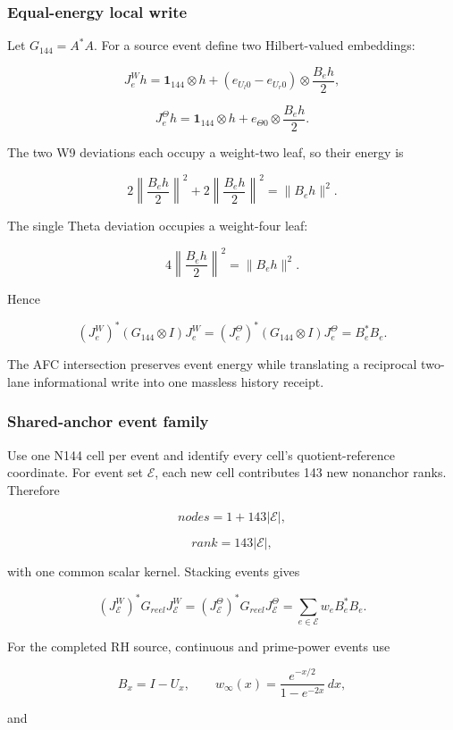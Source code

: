 \subsubsection{Equal-energy local write}\label{viii-ch06-equal-energy-local-write}

Let \(G_{144}=A^*A\). For a source event define two Hilbert-valued
embeddings:

\[
J_e^Wh
=\mathbf1_{144}\otimes h
+(e_{U_l0}-e_{U_r0})\otimes\frac{B_eh}{2},
\]

\[
J_e^\Theta h
=\mathbf1_{144}\otimes h
+e_{\Theta0}\otimes\frac{B_eh}{2}.
\]

The two W9 deviations each occupy a weight-two leaf, so their energy is

\[
2\left\|\frac{B_eh}{2}\right\|^2
+2\left\|\frac{B_eh}{2}\right\|^2
=\|B_eh\|^2.
\]

The single Theta deviation occupies a weight-four leaf:

\[
4\left\|\frac{B_eh}{2}\right\|^2
=\|B_eh\|^2.
\]

Hence

\[
(J_e^W)^*(G_{144}\otimes I)J_e^W
=(J_e^\Theta)^*(G_{144}\otimes I)J_e^\Theta
=B_e^*B_e.
\]

The AFC intersection preserves event energy while translating a
reciprocal two-lane informational write into one massless history
receipt.

\subsubsection{Shared-anchor event
family}\label{viii-ch06-shared-anchor-event-family}

Use one N144 cell per event and identify every cell's quotient-reference
coordinate. For event set \(\mathcal E\), each new cell contributes 143
new nonanchor ranks. Therefore

\[
nodes=1+143|\mathcal E|,
\]

\[
rank=143|\mathcal E|,
\]

with one common scalar kernel. Stacking events gives

\[
(J_\mathcal E^W)^*G_{reel}J_\mathcal E^W
=(J_\mathcal E^\Theta)^*G_{reel}J_\mathcal E^\Theta
=\sum_{e\in\mathcal E}w_eB_e^*B_e.
\]

For the completed RH source, continuous and prime-power events use

\[
B_x=I-U_x,
\qquad
w_\infty(x)=\frac{e^{-x/2}}{1-e^{-2x}}\,dx,
\]

and

